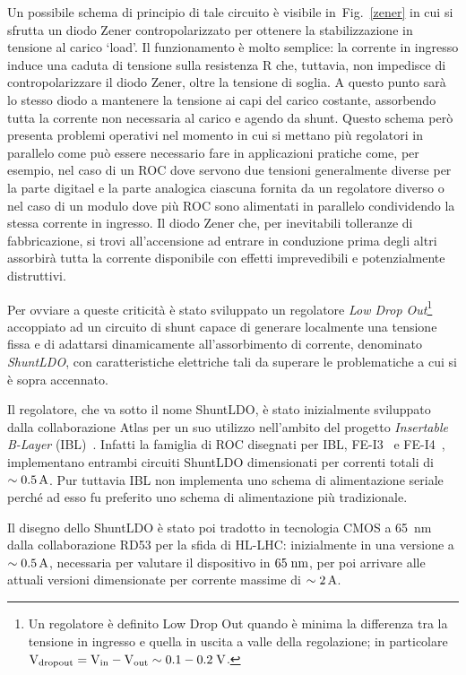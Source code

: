 Un possibile schema di principio di tale circuito \`e visibile in~Fig.~\ref{zener} in cui si sfrutta un diodo Zener contropolarizzato per ottenere la stabilizzazione in tensione al carico `load'. Il funzionamento è molto semplice: la corrente in ingresso induce una caduta di tensione sulla resistenza R che, tuttavia, non impedisce di contropolarizzare il diodo Zener, oltre la tensione di soglia. A questo punto sarà lo stesso diodo a mantenere la tensione ai capi del carico costante, assorbendo tutta la corrente non necessaria al carico e agendo da shunt. 
Questo schema però presenta problemi operativi nel momento in cui si mettano più regolatori in parallelo come pu\`o essere necessario fare in applicazioni pratiche come, per esempio, nel caso di un ROC dove servono due tensioni generalmente diverse per la parte digitael e la parte analogica ciascuna fornita da un regolatore diverso o nel caso di un modulo dove pi\`u ROC sono alimentati in parallelo condividendo la stessa corrente in ingresso. Il diodo Zener che, per inevitabili tolleranze di fabbricazione, si trovi all'accensione ad entrare in conduzione prima degli altri assorbir\`a tutta la corrente disponibile con effetti imprevedibili e potenzialmente distruttivi. 

Per ovviare a queste criticità è stato sviluppato un regolatore \textit{Low Drop Out}\footnote{Un regolatore è definito Low Drop Out quando \`e minima la differenza tra la tensione in ingresso e quella in uscita a valle della regolazione; in particolare$\mathrm{V_{dropout}=V_{in}-V_{out}\sim 0.1-0.2 \rm \; V}$.} accoppiato ad un circuito di shunt capace di generare localmente una tensione fissa e di adattarsi dinamicamente all'assorbimento di corrente, denominato {\em ShuntLDO}, con caratteristiche elettriche tali da superare le problematiche a cui si \`e sopra accennato.

Il regolatore, che va sotto il nome ShuntLDO, \`e stato inizialmente sviluppato dalla collaborazione Atlas per un suo utilizzo nell'ambito del progetto {\em Insertable B-Layer} (IBL)~\cite{IBL}. Infatti la famiglia di ROC disegnati per IBL, FE-I3~\cite{ROCFEI3} e FE-I4~\cite{ROCFEI4}, implementano entrambi circuiti ShuntLDO dimensionati per correnti totali di $\sim 0.5\rm \, A$. Pur tuttavia IBL non implementa uno schema di alimentazione seriale perch\'e ad esso fu preferito uno schema di alimentazione pi\`u tradizionale.

Il disegno dello ShuntLDO \`e stato poi tradotto in tecnologia CMOS a 65~nm dalla collaborazione RD53 per la sfida di HL-LHC: inizialmente in una versione a $\sim 0.5\rm \, A$, necessaria per valutare il dispositivo in $65\rm \; nm$, per poi arrivare alle attuali versioni dimensionate per corrente massime di $\sim 2\rm \, A$.

